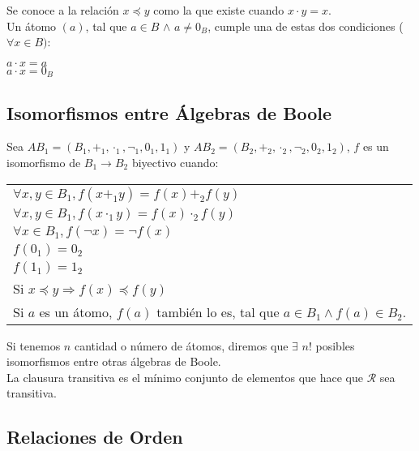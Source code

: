 \documentclass[titlepage,a4paper,12pt,twoside]{article}
\begin{document}
Se conoce a la relación $x \preccurlyeq y$ como la que existe cuando $x \cdot y = x$.\\

Un átomo $(a)$, tal que $a \in B $ $\wedge $ $a \neq 0_{B}$, cumple una de estas dos condiciones ($\forall x \in B)$:

\begin{center}
$a \cdot x = a$ \\
$a \cdot x = 0_{B}$ \\
\end{center}

\subsection{Isomorfismos entre Álgebras de Boole}

Sea $AB_{1} = (B_{1},+_{1},\cdot_{1},\neg_{1},0_{1},1_{1})$ y $AB_{2} = (B_{2},+_{2},\cdot_{2},\neg_{2},0_{2},1_{2})$, $f$ es un isomorfismo de $B_{1} \rightarrow B_{2}$ biyectivo cuando:\\

\begin{table}[htbp]
\centering
\begin{tabular}{l}
 $\forall x,y \in B_{1} , f(x+_{1}y)=f(x)+_{2}f(y)$\\
 $\forall x,y \in B_{1} , f(x\cdot_{1}y)=f(x)\cdot_{2}f(y)$\\
 $\forall x \in B_{1} , f(\neg x)=\neg f(x)$\\
 $f(0_{1}) = 0_{2}$\\
 $f(1_{1}) = 1_{2}$\\
 Si $x \preccurlyeq y \Rightarrow f(x) \preccurlyeq f(y)$\\
 Si $a$ es un átomo, $f(a)$ también lo es, tal que $a \in B_{1} \wedge f(a) \in B_{2}$.\\
\end{tabular}
\label{tabla}
\end{table}

Si tenemos $n$ cantidad o número de átomos, diremos que $\exists $ $n!$ posibles isomorfismos entre otras álgebras de Boole.\\

La clausura transitiva es el mínimo conjunto de elementos que hace que $\mathcal{R}$ sea transitiva.

\subsection{Relaciones de Orden}
\end{document}
